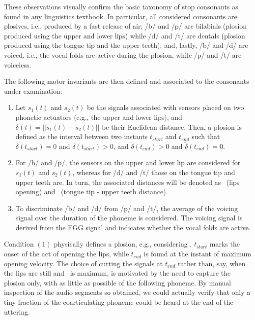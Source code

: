 These observations visually confirm the basic taxonomy of stop consonants 
as found in any linguistics textbook.
In particular, all considered consonants are plosives,
i.e., produced by a fast release of air; /b/ and /p/ are bilabials
(plosion produced using the upper and lower lips) while /d/ and /t/ are
dentals (plosion produced using the tongue tip and the upper teeth);
and, lastly, /b/ and /d/ are voiced, i.e., the vocal folds are active during
the plosion, while /p/ and /t/ are voiceless.

The following motor invariants are then defined and associated to the
consonants under examination:

\begin{enumerate}

  \item Let $s_1(t)$ and $s_2(t)$ be the signals associated
    with sensors placed on two phonetic actuators (e.g., the upper and
    lower lips), and $\delta(t) = ||s_1(t)-s_2(t)||$ be their
    Euclidean distance. Then, a plosion is defined as the interval
    between two instants $t_{start}$ and $t_{end}$ such that
    $\dot{\delta}(t_{start}) = 0 $ and $\ddot{\delta}(t_{start}) > 0$,
    and $\dot{\delta}(t_{end}) > 0 $ and $\ddot{\delta}(t_{end}) = 0$.

  \item For /b/ and /p/, the sensors on the upper and lower
    lip are considered for $s_1(t)$ and $s_2(t)$, whereas for /d/ and /t/
    those on the tongue tip and upper teeth are. In turn, the associated
    distances will be denoted as \lio\ (lips opening) and \ttu\
    (tongue tip - upper teeth distance).

  \item To discriminate /b/ and /d/ from /p/ and /t/, the average of the
    voicing signal over the duration of the phoneme is considered. The
    voicing signal is derived from the EGG signal and indicates
    whether the vocal folds are active.

\end{enumerate}

Condition $(1)$ physically defines a plosion, e.g., considering \lio, $t_{start}$
marks the onset of the act of opening the lips, while $t_{end}$ is found at the
instant of maximum opening velocity. The choice of cutting the signals at $t_{end}$
rather than, say, when the lips are still and \lio\ is maximum, is motivated by
the need to capture the plosion only, with as little as possible of the following
phoneme. By manual inspection of the audio segments so obtained, we could actually
verify that only a tiny fraction of the coarticulating phoneme could be heard
at the end of the uttering.

